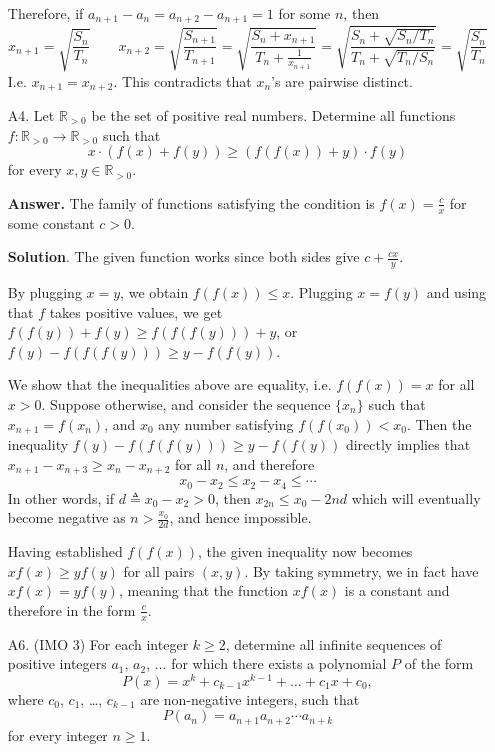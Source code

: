 \documentclass[11pt,a4paper]{article}
\begin{document}
\begin{enumerate}
		Therefore, if 
		$a_{n+1} - a_n = a_{n+2}-a_{n+1}=1$ for some $n$, 
		then 
		\[x_{n+1} = \sqrt{\frac{S_n}{T_n}}
		\qquad 
		x_{n+2} = \sqrt{\frac{S_{n+1}}{T_{n+1}}}
		= \sqrt{\frac{S_n + x_{n+1}}{T_n + \frac{1}{x_{n+1}}}}
		=\sqrt{\frac{S_n + \sqrt{S_n/T_n}}{T_n + \sqrt{T_n/S_n}}}
		=\sqrt{\frac{S_n}{T_n}}\]
		I.e. $x_{n+1}=x_{n+2}$. 
		This contradicts that $x_n$'s are pairwise distinct. 
		
		\item [A4.]
		Let $\mathbb R_{>0}$ be the set of positive real numbers. Determine all functions $f \colon \mathbb R_{>0} \to \mathbb R_{>0}$ such that\[x \cdot \left(f(x) + f(y)\right) \geq \left(f(f(x)) + y\right) \cdot f(y)\]for every $x, y \in \mathbb R_{>0}$.
		
		\textbf{Answer.} 
		The family of functions satisfying the condition is $f(x) = \frac{c}{x}$ for some constant $c > 0$. 
		
		\textbf{Solution}. 
		The given function works since both sides give 
		$c + \frac{cx}{y}$. 
		
		By plugging $x=y$, we obtain $f(f(x))\le x$. 
		Plugging $x = f(y)$ and using that $f$ takes positive values, 
		we get $f(f(y)) + f(y)\ge f(f(f(y))) + y$, 
		or $f(y) - f(f(f(y))) \ge y - f(f(y))$. 
		
		We show that the inequalities above are equality, i.e. 
		$f(f(x)) = x$ for all $x > 0$. 
		Suppose otherwise, and consider the sequence $\{x_n\}$ such that $x_{n+1} = f(x_n)$, 
		and $x_0$ any number satisfying $f(f(x_0)) < x_0$. 
		Then the inequality $f(y) - f(f(f(y))) \ge y - f(f(y))$ directly implies that 
		$x_{n+1} - x_{n+3} \ge x_n - x_{n+2}$ for all $n$, and therefore 
		\[
		x_0 - x_2 \le x_2 - x_4\le\cdots
		\]
		In other words, if $d\triangleq x_0-x_2 > 0$, 
		then $x_{2n}\le x_0 - 2nd$ which will eventually become negative as $n > \frac{x_0}{2d}$, and hence impossible. 
		
		Having established $f(f(x))$, 
		the given inequality now becomes $xf(x) \ge yf(y)$ for all pairs $(x, y)$. 
		By taking symmetry, we in fact have $xf(x) = yf(y)$, 
		meaning that the function $xf(x)$ is a constant and therefore in the form $\frac{c}{x}$. 
		
		\item [A6.] (IMO 3)
		For each integer $k\geq 2$, determine all infinite sequences of positive integers $a_1$, $a_2$, $\ldots$ for which there exists a polynomial $P$ of the form\[ P(x)=x^k+c_{k-1}x^{k-1}+\dots + c_1 x+c_0, \]where $c_0$, $c_1$, \dots, $c_{k-1}$ are non-negative integers, such that\[ P(a_n)=a_{n+1}a_{n+2}\cdots a_{n+k} \]for every integer $n\geq 1$.
	\end{enumerate}
    
\end{document}
